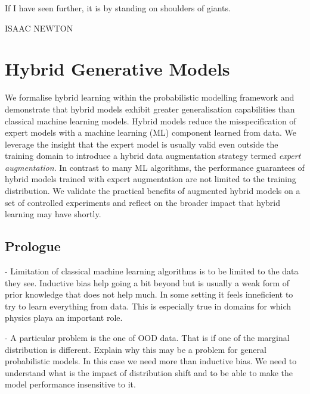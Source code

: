 \null\vfill
{\centering
\parbox{\textwidth}{%
  \raggedright
  {%

   If I have seen further, it is by standing on shoulders of giants.\par\bigskip
  }
  \raggedleft\MakeUppercase{Isaac Newton}\par%
}}

\vfill\vfill

\chapter{Hybrid Generative Models}\label{ch:07}

\begin{chapter_outline}

  We formalise hybrid learning within the probabilistic modelling framework and demonstrate that hybrid models exhibit greater generalisation capabilities than classical machine learning models.
  Hybrid models reduce the misspecification of expert models with a machine learning (ML) component learned from data. We leverage the insight that the expert model is usually valid even outside the training domain to introduce a hybrid data augmentation strategy termed \textit{expert augmentation}. In contrast to many ML algorithms, the performance guarantees of hybrid models trained with expert augmentation are not limited to the training distribution. We validate the practical benefits of augmented hybrid models on a set of controlled experiments and reflect on the broader impact that hybrid learning may have shortly.

\end{chapter_outline}

\section{Prologue}
- Limitation of classical machine learning algorithms is to be limited to the data they see. Inductive bias help going a bit beyond but is usually a weak form of prior knowledge that does not help much. In some setting it feels inneficient to try to learn everything from data. This is especially true in domains for which physics playa an important role.

- A particular problem is the one of OOD data. That is if one of the marginal distribution is different. Explain why this may be a problem for general probabilistic models. In this case we need more than inductive bias. We need to understand what is the impact of distribution shift and to be able to make the model performance insensitive to it.

